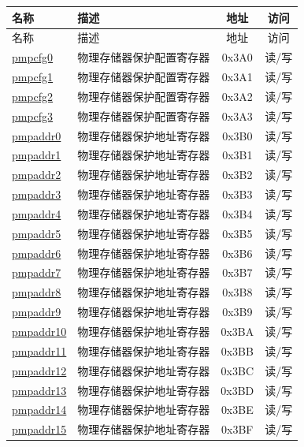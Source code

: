 
\begin{longtable}{ | p{4.0cm} | p{8.4cm} | c | c| }
\hline\rowcolor{lightgray}
名称 & 描述 & 地址 & 访问 \\ \hline
\endfirsthead
\hline
\rowcolor{lightgray}
名称 & 描述 & 地址 & 访问 \\ \hline
\endhead
\endfoot

\hyperref[sec:riscvcpu-pmp-reg-desc]{pmpcfg0} & 物理存储器保护配置寄存器 & 0x3A0 & 读/写 \\\hline
\hyperref[sec:riscvcpu-pmp-reg-desc]{pmpcfg1} & 物理存储器保护配置寄存器 & 0x3A1 & 读/写 \\\hline
\hyperref[sec:riscvcpu-pmp-reg-desc]{pmpcfg2} & 物理存储器保护配置寄存器 & 0x3A2 & 读/写 \\\hline
\hyperref[sec:riscvcpu-pmp-reg-desc]{pmpcfg3} & 物理存储器保护配置寄存器 & 0x3A3 & 读/写 \\\hline
\hyperref[sec:riscvcpu-pmp-reg-desc]{pmpaddr0} & 物理存储器保护地址寄存器 & 0x3B0 & 读/写 \\\hline
\hyperref[sec:riscvcpu-pmp-reg-desc]{pmpaddr1} & 物理存储器保护地址寄存器 & 0x3B1 & 读/写 \\\hline
\hyperref[sec:riscvcpu-pmp-reg-desc]{pmpaddr2} & 物理存储器保护地址寄存器 & 0x3B2 & 读/写 \\\hline
\hyperref[sec:riscvcpu-pmp-reg-desc]{pmpaddr3} & 物理存储器保护地址寄存器 & 0x3B3 & 读/写 \\\hline
\hyperref[sec:riscvcpu-pmp-reg-desc]{pmpaddr4} & 物理存储器保护地址寄存器 & 0x3B4 & 读/写 \\\hline
\hyperref[sec:riscvcpu-pmp-reg-desc]{pmpaddr5} & 物理存储器保护地址寄存器 & 0x3B5 & 读/写 \\\hline
\hyperref[sec:riscvcpu-pmp-reg-desc]{pmpaddr6} & 物理存储器保护地址寄存器 & 0x3B6 & 读/写 \\\hline
\hyperref[sec:riscvcpu-pmp-reg-desc]{pmpaddr7} & 物理存储器保护地址寄存器 & 0x3B7 & 读/写 \\\hline
\hyperref[sec:riscvcpu-pmp-reg-desc]{pmpaddr8} & 物理存储器保护地址寄存器 & 0x3B8 & 读/写 \\\hline
\hyperref[sec:riscvcpu-pmp-reg-desc]{pmpaddr9} & 物理存储器保护地址寄存器 & 0x3B9 & 读/写 \\\hline
\hyperref[sec:riscvcpu-pmp-reg-desc]{pmpaddr10} & 物理存储器保护地址寄存器 & 0x3BA & 读/写 \\\hline
\hyperref[sec:riscvcpu-pmp-reg-desc]{pmpaddr11} & 物理存储器保护地址寄存器 & 0x3BB & 读/写 \\\hline
\hyperref[sec:riscvcpu-pmp-reg-desc]{pmpaddr12} & 物理存储器保护地址寄存器 & 0x3BC & 读/写 \\\hline
\hyperref[sec:riscvcpu-pmp-reg-desc]{pmpaddr13} & 物理存储器保护地址寄存器 & 0x3BD & 读/写 \\\hline
\hyperref[sec:riscvcpu-pmp-reg-desc]{pmpaddr14} & 物理存储器保护地址寄存器 & 0x3BE & 读/写 \\\hline
\hyperref[sec:riscvcpu-pmp-reg-desc]{pmpaddr15} & 物理存储器保护地址寄存器 & 0x3BF & 读/写 \\\hline

\end{longtable}
